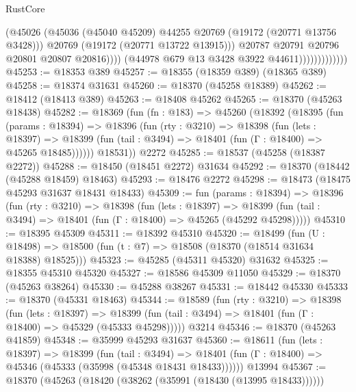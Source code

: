 \begin{lexlean}{RustCore}
\begin{coremodule}
                                    (@45026
                                      (@45036
                                        (@45040 @45209)
                                        @44255
                                        @20769
                                        (@19172 (@20771 @13756 @3428)))
                                      @20769
                                      (@19172 (@20771 @13722 @13915)))
                                    @20787
                                    @20791
                                    @20796
                                    @20801
                                    @20807
                                    @20816))))
                            (@44978 @679 @13 @3428 @3922 @44611)))))))))))))
@45253 := @18353 @389
@45257 := @18355 (@18359 @389) (@18365 @389)
@45258 := @18374 @31631
@45260 := @18370 (@45258 @18389)
@45262 := @18412 (@18413 @389)
@45263 := @18408 @45262
@45265 := @18370 (@45263 @18438)
@45282 := @18369
    (fun (fn : @183) =>
    @45260
      (@18392
        (@18395
          (fun (params : @18394) =>
          @18396
            (fun (rty : @3210) =>
            @18398
              (fun (lets : @18397) =>
              @18399 (fun (tail : @3494) => @18401 (fun (Γ : @18400) => @45265 @18485))))))
        @18531))
    @2272
@45285 := @18537 (@45258 (@18387 @2272))
@45288 := @18450 (@18451 @2272) @31634
@45292 := @18370 (@18442 (@45288 @18459) @18463)
@45293 := @18476 @2272
@45298 := @18473 (@18475 @45293 @31637 @18431 @18433)
@45309 := fun (params : @18394) =>
  @18396
    (fun (rty : @3210) =>
    @18398
      (fun (lets : @18397) =>
      @18399 (fun (tail : @3494) => @18401 (fun (Γ : @18400) => @45265 (@45292 @45298)))))
@45310 := @18395 @45309
@45311 := @18392 @45310
@45320 := @18499
    (fun (U : @18498) => @18500 (fun (t : @7) => @18508 (@18370 (@18514 @31634 @18388) @18525)))
@45323 := @45285 (@45311 @45320) @31632
@45325 := @18355 @45310 @45320
@45327 := @18586 @45309 @11050
@45329 := @18370 (@45263 @38264)
@45330 := @45288 @38267
@45331 := @18442 @45330
@45333 := @18370 (@45331 @18463)
@45344 := @18589
    (fun (rty : @3210) =>
    @18398
      (fun (lets : @18397) =>
      @18399 (fun (tail : @3494) => @18401 (fun (Γ : @18400) => @45329 (@45333 @45298)))))
    @3214
@45346 := @18370 (@45263 @41859)
@45348 := @35999 @45293 @31637
@45360 := @18611
    (fun (lets : @18397) =>
    @18399
      (fun (tail : @3494) =>
      @18401 (fun (Γ : @18400) => @45346 (@45333 (@35998 (@45348 @18431 @18433))))))
    @13994
@45367 := @18370 (@45263 (@18420 (@38262 (@35991 (@18430 (@13995 @18433))))))

\end{coremodule}
\end{lexlean}
